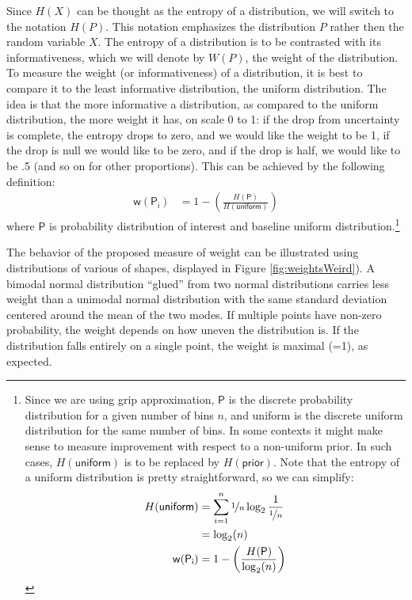 \documentclass[
  10pt,
  dvipsnames,enabledeprecatedfontcommands]{scrartcl}
\begin{document}
Since \(H(X)\) can be thought as the entropy of a distribution, we will
switch to the notation \(H(P)\). This notation emphasizes the
distribution \(P\) rather then the random variable \(X\). The entropy of
a distribution is to be contrasted with its informativeness, which we
will denote by \(W(P)\), the weight of the distribution. To measure the
weight (or informativeness) of a distribution, it is best to compare it
to the least informative distribution, the uniform distribution. The
idea is that the more informative a distribution, as compared to the
uniform distribution, the more weight it has, on scale 0 to 1: if the
drop from uncertainty is complete, the entropy drops to zero, and we
would like the weight to be 1, if the drop is null we would like to be
zero, and if the drop is half, we would like to be .5 (and so on for
other proportions). This can be achieved by the following definition:
\begin{align*}
\mathsf{w(P_i)} & = 1 - \left( \frac{H(\mathsf{P})}{H(\mathsf{uniform})}\right)
\end{align*} \noindent where \(\mathsf{P}\) is probability distribution
of interest and baseline uniform distribution.\footnote{Since we are
  using grip approximation, \(\mathsf{P}\) is the discrete probability
  distribution for a given number of bins \(n\), and uniform is the
  discrete uniform distribution for the same number of bins. In some
  contexts it might make sense to measure improvement with respect to a
  non-uniform prior. In such cases, \(H(\mathsf{uniform})\) is to be
  replaced by \(H(\mathsf{prior})\). Note that the entropy of a uniform
  distribution is pretty straightforward, so we can simplify:
  \begin{align*}
  H(\mathsf{uniform}) & = \sum_{i=1}^n \nicefrac{1}{n} \log_2 \frac{1}{\nicefrac{1}{n}} \\
  & = \log_2(n) \\
  \mathsf{w(P_i)} & = 1 - \left( \frac{H(\mathsf{P})}{\log_2(n)}\right)
  \end{align*}}

The behavior of the proposed measure of weight can be illustrated using
distributions of various of shapes, displayed in Figure
\ref{fig:weightsWeird}). A bimodal normal distribution ``glued'' from
two normal distributions carries less weight than a unimodal normal
distribution with the same standard deviation centered around the mean
of the two modes. If multiple points have non-zero probability, the
weight depends on how uneven the distribution is. If the distribution
falls entirely on a single point, the weight is maximal (=1), as
expected.
\end{document}
